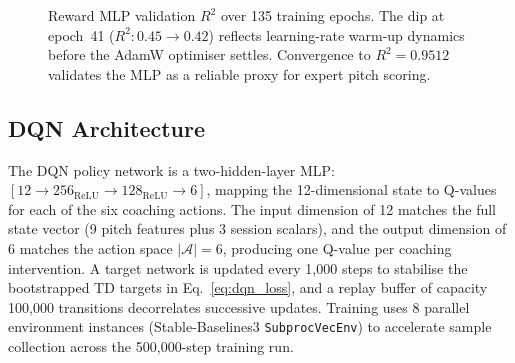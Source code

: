 \documentclass{article}
\begin{document}
\begin{figure}[htbp]
\centering
{}
\caption{Reward MLP validation $R^2$ over 135 training epochs.
         The dip at epoch~41 ($R^2: 0.45 \to 0.42$) reflects learning-rate
         warm-up dynamics before the AdamW optimiser settles.
         Convergence to $R^2 = 0.9512$ validates the MLP as a reliable
         proxy for expert pitch scoring.}
\label{fig:reward_mlp}
\end{figure}

\FloatBarrier
\subsection{DQN Architecture}

The DQN policy network is a two-hidden-layer MLP:
$[12 \!\to\! 256_{\text{ReLU}} \!\to\! 128_{\text{ReLU}} \!\to\! 6]$,
mapping the 12-dimensional state to Q-values for each of the six coaching
actions. The input dimension of 12 matches the full state vector (9 pitch features
plus 3 session scalars), and the output dimension of 6 matches the action
space $|\mathcal{A}|=6$, producing one Q-value per coaching intervention.
A target network is updated every 1{,}000 steps to stabilise the bootstrapped
TD targets in Eq.~\eqref{eq:dqn_loss}, and a replay buffer of capacity
100{,}000 transitions decorrelates successive updates. Training uses 8
parallel environment instances (Stable-Baselines3 \texttt{SubprocVecEnv})
to accelerate sample collection across the 500{,}000-step training run.
\end{document}
